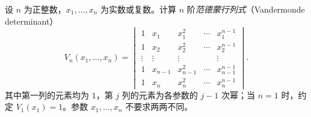 \begin{example}
\label{ex:determinant-vandermonde}
设 $n$ 为正整数，$x_1,\ldots,x_n$ 为实数或复数。计算 $n$ 阶\emph{范德蒙行列式}（Vandermonde determinant）
\begin{equation}
\label{eq:vandermonde-definition}
    V_n(x_1,\ldots,x_n)=
    \begin{vmatrix}
        1 & x_1 & x_1^2 & \cdots & x_1^{n-1} \\
        1 & x_2 & x_2^2 & \cdots & x_2^{n-1} \\
        \vdots & \vdots & \vdots & & \vdots \\
        1 & x_{n-1} & x_{n-1}^2 & \cdots & x_{n-1}^{n-1} \\
        1 & x_n & x_n^2 & \cdots & x_n^{n-1}
    \end{vmatrix}.
\end{equation}
其中第一列的元素均为 $1$，第 $j$ 列的元素为各参数的 $j-1$ 次幂；当 $n=1$ 时，约定 $V_1(x_1)=1$。参数 $x_1,\ldots,x_n$ 不要求两两不同。
\end{example}


